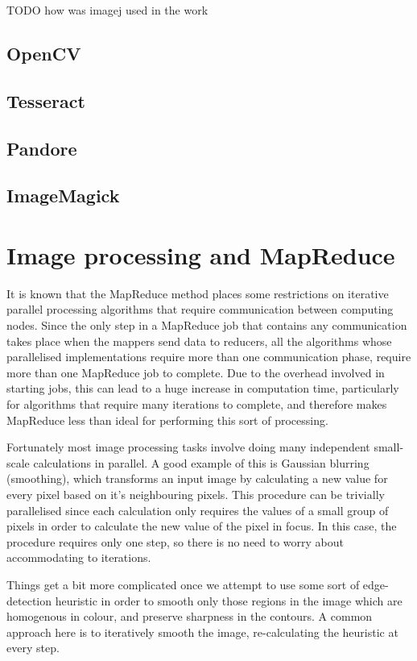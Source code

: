 \documentclass [12pt,a4paper]{report}
\begin{document}
TODO how was imagej used in the work

\subsection{OpenCV}

\subsection{Tesseract}

\subsection{Pandore}

\subsection{ImageMagick}

\section{Image processing and MapReduce}

It is known that the MapReduce method places some restrictions on iterative parallel processing algorithms that require communication between computing nodes. Since the only step in a MapReduce job that contains any communication takes place when the mappers send data to reducers, all the algorithms whose parallelised implementations require more than one communication phase, require more than one MapReduce job to complete. Due to the overhead involved in starting jobs, this can lead to a huge increase in computation time, particularly for algorithms that require many iterations to complete, and therefore makes MapReduce less than ideal for performing this sort of processing.

Fortunately most image processing tasks involve doing many independent small-scale calculations in parallel. A good example of this is Gaussian blurring (smoothing), which transforms an input image by calculating a new value for every pixel based on it's neighbouring pixels. This procedure can be trivially parallelised since each calculation only requires the values of a small group of pixels in order to calculate the new value of the pixel in focus. In this case, the procedure requires only one step, so there is no need to worry about accommodating to iterations.

Things get a bit more complicated once we attempt to use some sort of edge-detection heuristic in order to smooth only those regions in the image which are homogenous in colour, and preserve sharpness in the contours. A common approach here is to iteratively smooth the image, re-calculating the heuristic at every step. 
\end{document}
